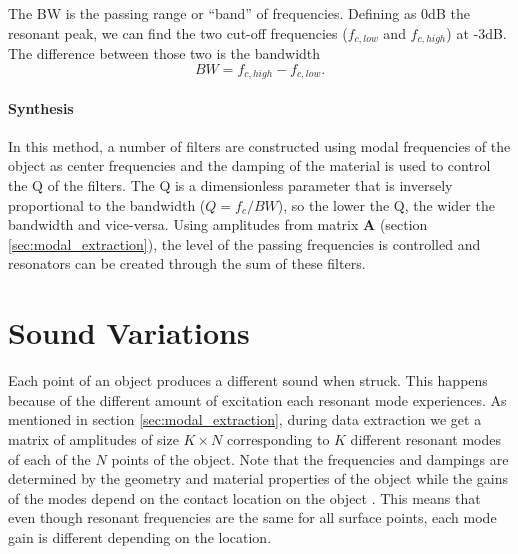 The \gls{BW} is the passing range or ``band'' of frequencies. Defining as 0dB the resonant peak, we can find the two cut-off frequencies ($f_{c,low}$ and $f_{c,high}$) at -3dB. The difference between those two is the bandwidth  
\begin{equation}\label{eq:bw}
BW = f_{c,high}-f_{c,low}.
\end{equation} \cite{bib:bpf}  

\paragraph{Synthesis}\label{par:synth}
\hfill \break

In this method, a number of filters are constructed using modal frequencies of the object as center frequencies and the damping of the material is used to control the \gls{Q} of the filters.  The \gls{Q} is a dimensionless parameter that is inversely proportional to the bandwidth ($Q=f_c/BW$), so the lower the \gls{Q}, the wider the bandwidth and vice-versa. Using amplitudes from matrix \textbf{A} (section \ref{sec:modal_extraction}), the level of the passing frequencies is controlled and resonators can be created through the sum of these filters. 

\section{Sound Variations} \label{sec:sound_variation}
Each point of an object produces a different sound when struck. This happens because of the different amount of excitation each resonant mode experiences. As mentioned in section \ref{sec:modal_extraction}, during data extraction we get a matrix of amplitudes of size $K\times N$ corresponding to $K$ different resonant modes of each of the $N$ points of the object. Note that the frequencies and dampings are determined by the geometry and material properties of the object while the gains of the modes depend on the contact location on the
object \cite{van2001foleyautomatic}. This means that even though resonant frequencies are the same for all surface points, each mode gain is different depending on the location.

